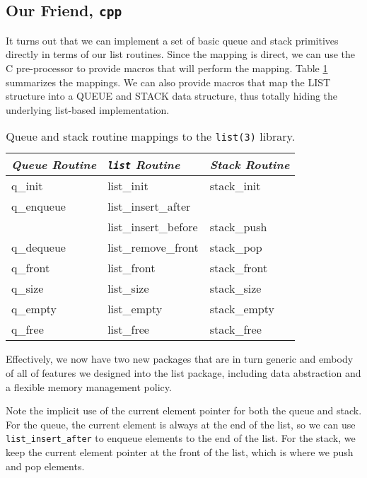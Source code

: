 \documentclass[fullpage,11pt]{article}
\begin{document}
\subsection{Our Friend, {\tt cpp}}
It turns out that we can implement a set of basic queue and stack primitives
directly in terms of our list routines.  Since the mapping is direct, we can
use the C pre-processor to provide macros that will perform the
mapping.  Table \ref{mappings} summarizes the mappings.  We can also provide
macros that map the LIST structure into a QUEUE and STACK data structure, thus
totally hiding the underlying list-based implementation.
\begin{table}[t]
\begin{centering}
\begin{tabular}{|l|l|l|} \hline
{\em Queue Routine} & {\em {\tt list} Routine} & {\em Stack Routine} \\ \hline \hline
q\_init             & list\_init	       & stack\_init  \\ \hline
q\_enqueue          & list\_insert\_after      &              \\ \hline
                    & list\_insert\_before     & stack\_push  \\ \hline
q\_dequeue          & list\_remove\_front      & stack\_pop   \\ \hline
q\_front            & list\_front	       & stack\_front \\ \hline
q\_size             & list\_size	       & stack\_size  \\ \hline
q\_empty            & list\_empty	       & stack\_empty \\ \hline
q\_free             & list\_free	       & stack\_free  \\ \hline
\end{tabular}
\caption{Queue and stack routine mappings to the {\tt list(3)} library.}
\label{mappings}
\end{centering}
\end{table}
Effectively, we now have two new packages that are in turn generic and
embody of all of features we designed into the list package, including
data abstraction and a flexible memory management policy.

Note the implicit use of the current element pointer for both the queue and
stack.  For the queue, the current element is always at the end of the list,
so we can use {\tt list\_insert\_after} to enqueue elements to the end of the
list.  For the stack, we keep the current element pointer at the front of the
list, which is where we push and pop elements.
\end{document}
